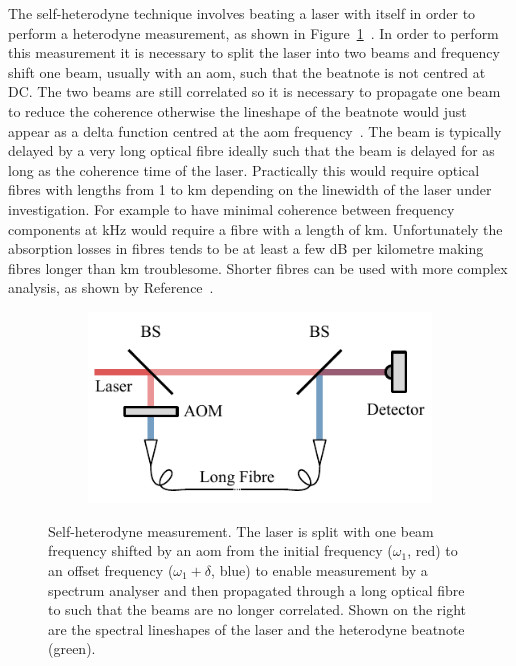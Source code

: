 The self-heterodyne technique involves beating a laser with itself in order to perform a heterodyne measurement, as shown in Figure~\ref{figure:self_heterodyne}~\cite{okoshi_novel_1980}.
In order to perform this measurement it is necessary to split the laser into two beams and frequency shift one beam, usually with an \gls{aom}, such that the beatnote is not centred at DC.
The two beams are still correlated so it is necessary to propagate one beam to reduce the coherence otherwise the lineshape of the beatnote would just appear as a delta function centred at the \gls{aom} frequency~\cite{richter_linewidth_1986}.
The beam is typically delayed by a very long optical fibre ideally such that the beam is delayed for as long as the coherence time of the laser.
Practically this would require optical fibres with lengths from 1 to \unit[100]{km} depending on the linewidth of the laser under investigation.
For example to have minimal coherence between frequency components at \unit[1]{kHz} would require a fibre with a length of \unit[300]{km}.
Unfortunately the absorption losses in fibres tends to be at least a few dB per kilometre making fibres longer than \unit[10]{km} troublesome.
Shorter fibres can be used with more complex analysis, as shown by Reference~\cite{richter_linewidth_1986}.

\begin{figure}
    \begin{subfigure}{0.49\linewidth}
    \includegraphics{part1/Figs/SelfHeterodyne.pdf}
    \end{subfigure}
    \begin{subfigure}{0.49\linewidth}
    
    \end{subfigure}
    \caption[Self-heterodyne measurement.]{Self-heterodyne measurement. The laser is split with one beam frequency shifted by an \gls{aom} from the initial frequency ($\omega_1$, red) to an offset frequency ($\omega_1+\delta$, blue) to enable measurement by a spectrum analyser and then propagated through a long optical fibre to such that the beams are no longer correlated. Shown on the right are the spectral lineshapes of the laser and the heterodyne beatnote (green).}
    \label{figure:self_heterodyne}
\end{figure}

